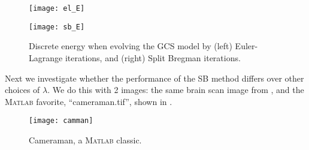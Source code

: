 \begin{figure}[htb!]
	\centering
	\begin{minipage}{0.40\textwidth}
		\texttt{[image: el\_E]}
	\end{minipage}\quad
	\begin{minipage}{0.40\textwidth}
		\texttt{[image: sb\_E]}
	\end{minipage}%
	\caption{Discrete energy when evolving the GCS model by (left) Euler-Lagrange iterations, and (right) Split Bregman iterations.}
	\label{fig:sb_energy}
\end{figure}

Next we investigate whether the performance of the SB method differs over other choices of $\lambda$. We do this with 2 images: the same brain scan image from , and the \textsc{Matlab} favorite, ``cameraman.tif'', shown in .

\begin{figure}[htb!]
	\centering
	\begin{minipage}{0.40\textwidth}
		\texttt{[image: camman]}
	\end{minipage}\quad
	\caption{Cameraman, a \textsc{Matlab} classic.}
	\label{fig:cam}
\end{figure}

